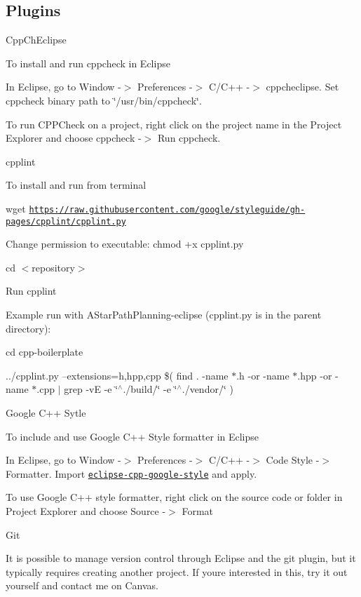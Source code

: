\subsection*{Plugins}


\begin{DoxyItemize}
\item Cpp\+Ch\+Eclipse

To install and run cppcheck in Eclipse
\begin{DoxyEnumerate}
\item In Eclipse, go to Window -\/$>$ Preferences -\/$>$ C/\+C++ -\/$>$ cppcheclipse. Set cppcheck binary path to \char`\"{}/usr/bin/cppcheck\char`\"{}.
\item To run C\+P\+P\+Check on a project, right click on the project name in the Project Explorer and choose cppcheck -\/$>$ Run cppcheck.
\end{DoxyEnumerate}
\item cpplint

To install and run from terminal
\begin{DoxyEnumerate}
\item wget \href{https://raw.githubusercontent.com/google/styleguide/gh-pages/cpplint/cpplint.py}{\tt https\+://raw.\+githubusercontent.\+com/google/styleguide/gh-\/pages/cpplint/cpplint.\+py}
\item Change permission to executable\+: chmod +x cpplint.\+py
\item cd $<$repository$>$
\item Run cpplint
\end{DoxyEnumerate}

Example run with A\+Star\+Path\+Planning-\/eclipse (cpplint.\+py is in the parent directory)\+:

cd cpp-\/boilerplate

../cpplint.py --extensions=h,hpp,cpp \$( find . -\/name $\ast$.h -\/or -\/name $\ast$.hpp -\/or -\/name $\ast$.cpp $\vert$ grep -\/vE -\/e \char`\"{}$^\wedge$./build/\char`\"{} -\/e \char`\"{}$^\wedge$./vendor/\char`\"{} )
\item Google C++ Sytle

To include and use Google C++ Style formatter in Eclipse
\begin{DoxyEnumerate}
\item In Eclipse, go to Window -\/$>$ Preferences -\/$>$ C/\+C++ -\/$>$ Code Style -\/$>$ Formatter. Import \href{https://raw.githubusercontent.com/google/styleguide/gh-pages/eclipse-cpp-google-style.xml}{\tt eclipse-\/cpp-\/google-\/style} and apply.
\item To use Google C++ style formatter, right click on the source code or folder in Project Explorer and choose Source -\/$>$ Format
\end{DoxyEnumerate}
\item Git

It is possible to manage version control through Eclipse and the git plugin, but it typically requires creating another project. If you\textquotesingle{}re interested in this, try it out yourself and contact me on Canvas. 
\end{DoxyItemize}